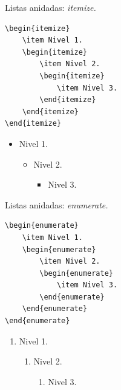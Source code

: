 \documentclass[dvipsnames,xcolor, handout]{beamer}
\theoremstyle{plain}
\theoremstyle{definition}
\begin{document}
\begin{frame}[fragile]{Listas anidadas: \itshape itemize.}
\begin{minipage}{0.55\linewidth}
\begin{verbatim}
\begin{itemize}
    \item Nivel 1.
    \begin{itemize}
        \item Nivel 2.
        \begin{itemize}
            \item Nivel 3.
        \end{itemize}
    \end{itemize}
\end{itemize}    
\end{verbatim}
    \end{minipage}\pause
    \begin{minipage}{0.45\linewidth}
\begin{itemize}
\item Nivel 1.
\begin{itemize}
    \item Nivel 2.
    \begin{itemize}
        \item Nivel 3.
    \end{itemize}
\end{itemize}
\end{itemize}    
    \end{minipage}

\end{frame}

\begin{frame}[fragile]{Listas anidadas: \itshape enumerate.}
\begin{minipage}{0.55\linewidth}
\begin{verbatim}
\begin{enumerate}
    \item Nivel 1.
    \begin{enumerate}
        \item Nivel 2.
        \begin{enumerate}
            \item Nivel 3.
        \end{enumerate}
    \end{enumerate}
\end{enumerate}    
\end{verbatim}
    \end{minipage}\pause
    \begin{minipage}{0.45\linewidth}
\begin{enumerate}
    \item Nivel 1.
    \begin{enumerate}
        \item Nivel 2.
        \begin{enumerate}
            \item Nivel 3.
        \end{enumerate}
    \end{enumerate}
\end{enumerate}   
\end{minipage}
\end{frame}
\end{document}
